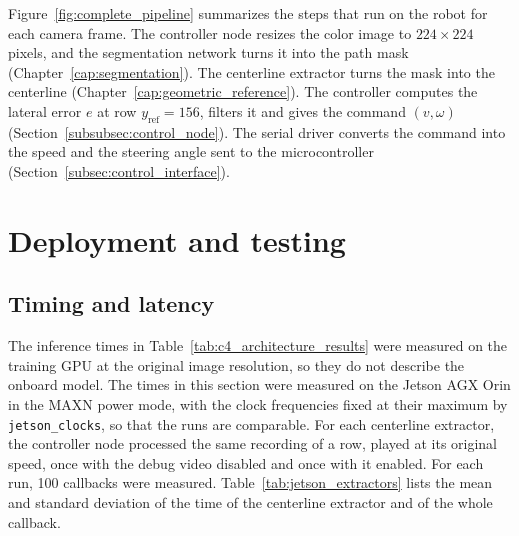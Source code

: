 Figure~\ref{fig:complete_pipeline} summarizes the steps that run on the robot for each camera frame. The controller node resizes the color image to $224\times224$ pixels, and the segmentation network turns it into the path mask (Chapter~\ref{cap:segmentation}). The centerline extractor turns the mask into the centerline (Chapter~\ref{cap:geometric_reference}). The controller computes the lateral error $e$ at row $y_{\mathrm{ref}}=156$, filters it and gives the command $(v,\omega)$ (Section~\ref{subsubsec:control_node}). The serial driver converts the command into the speed and the steering angle sent to the microcontroller (Section~\ref{subsec:control_interface}).

\section{Deployment and testing}
\label{sec:deployment}

\subsection{Timing and latency}
\label{subsec:timing}

The inference times in Table~\ref{tab:c4_architecture_results} were measured on the training GPU at the original image resolution, so they do not describe the onboard model. The times in this section were measured on the Jetson AGX Orin in the MAXN power mode, with the clock frequencies fixed at their maximum by \texttt{jetson\_clocks}, so that the runs are comparable. For each centerline extractor, the controller node processed the same recording of a row, played at its original speed, once with the debug video disabled and once with it enabled. For each run, 100 callbacks were measured. Table~\ref{tab:jetson_extractors} lists the mean and standard deviation of the time of the centerline extractor and of the whole callback.

